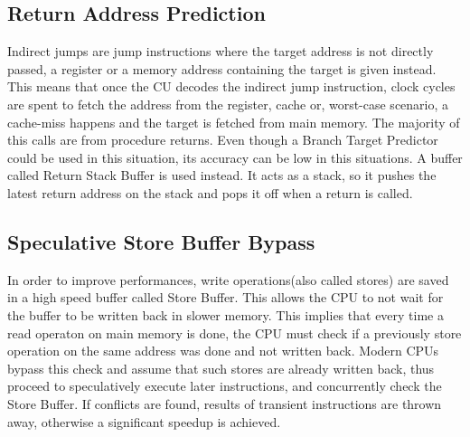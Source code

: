 \subsection{Return Address Prediction}
Indirect jumps are jump instructions where the target address is not directly passed, a register or a memory address containing the target is given instead.
This means that once the CU decodes the indirect jump instruction, clock cycles are spent to fetch the address from the register, cache or, worst-case scenario, a cache-miss happens and the target is fetched from main memory.
The majority of this calls are from procedure returns. Even though a Branch Target Predictor could be used in this situation, its accuracy can be low in this situations. A buffer called Return Stack Buffer is used instead. It acts as a stack, so it pushes the latest return address on the stack and pops it off when a return is called.

\subsection{Speculative Store Buffer Bypass}
In order to improve performances, write operations(also called stores) are saved in a high speed buffer called Store Buffer. This allows the CPU to not wait for the buffer to be written back in slower memory.
This implies that every time a read operaton on main memory is done, the CPU must check if a previously store operation on the same address was done and not written back. 
Modern CPUs bypass this check and assume that such stores are already written back, thus proceed to speculatively execute later instructions, and concurrently check the Store Buffer.
If conflicts are found, results of transient instructions are thrown away, otherwise a significant speedup is achieved.
